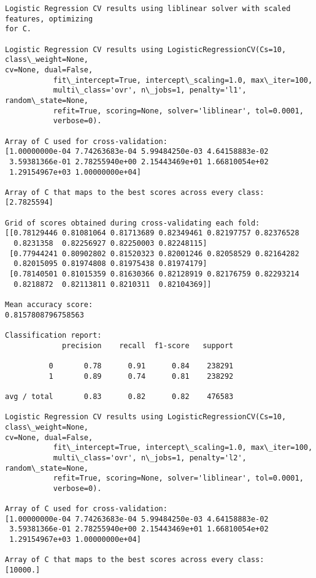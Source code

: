 \documentclass[11pt]{article}
\begin{document}
    \begin{Verbatim}[commandchars=\\\{\},fontsize=\footnotesize]
Logistic Regression CV results using liblinear solver with scaled features, optimizing
for C.

Logistic Regression CV results using LogisticRegressionCV(Cs=10, class\_weight=None,
cv=None, dual=False,
           fit\_intercept=True, intercept\_scaling=1.0, max\_iter=100,
           multi\_class='ovr', n\_jobs=1, penalty='l1', random\_state=None,
           refit=True, scoring=None, solver='liblinear', tol=0.0001,
           verbose=0).

Array of C used for cross-validation:
[1.00000000e-04 7.74263683e-04 5.99484250e-03 4.64158883e-02
 3.59381366e-01 2.78255940e+00 2.15443469e+01 1.66810054e+02
 1.29154967e+03 1.00000000e+04]

Array of C that maps to the best scores across every class:
[2.7825594]

Grid of scores obtained during cross-validating each fold:
[[0.78129446 0.81081064 0.81713689 0.82349461 0.82197757 0.82376528
  0.8231358  0.82256927 0.82250003 0.82248115]
 [0.77944241 0.80902802 0.81520323 0.82001246 0.82058529 0.82164282
  0.82015095 0.81974808 0.81975438 0.81974179]
 [0.78140501 0.81015359 0.81630366 0.82128919 0.82176759 0.82293214
  0.8218872  0.82113811 0.8210311  0.82104369]]

Mean accuracy score:
0.8157808796758563

Classification report:
             precision    recall  f1-score   support

          0       0.78      0.91      0.84    238291
          1       0.89      0.74      0.81    238292

avg / total       0.83      0.82      0.82    476583

Logistic Regression CV results using LogisticRegressionCV(Cs=10, class\_weight=None,
cv=None, dual=False,
           fit\_intercept=True, intercept\_scaling=1.0, max\_iter=100,
           multi\_class='ovr', n\_jobs=1, penalty='l2', random\_state=None,
           refit=True, scoring=None, solver='liblinear', tol=0.0001,
           verbose=0).

Array of C used for cross-validation:
[1.00000000e-04 7.74263683e-04 5.99484250e-03 4.64158883e-02
 3.59381366e-01 2.78255940e+00 2.15443469e+01 1.66810054e+02
 1.29154967e+03 1.00000000e+04]

Array of C that maps to the best scores across every class:
[10000.]


\end{Verbatim}
\end{document}
